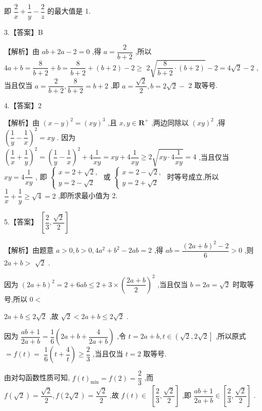 \documentclass[10pt]{article}
\begin{document}
即 $\dfrac{2}{x} + \dfrac{1}{y} - \dfrac{2}{z}$ 的最大值是 1.

3.【答案】B

【解析】由 ${ab} + {2a} - 2 = 0$ ,得 $a = \dfrac{2}{b + 2}$ ,所以 ${4a} + b = \dfrac{8}{b + 2} + b = \dfrac{8}{b + 2} + \left( {b + 2}\right)  - 2 \geq$  $2\sqrt{\dfrac{8}{b + 2} \cdot  \left( {b + 2}\right) } - 2 = 4\sqrt{2} - 2$ ,当且仅当 $a = \dfrac{2}{b + 2},\dfrac{8}{b + 2} = b + 2$ ,即 $a = \dfrac{\sqrt{2}}{2},b = 2\sqrt{2} -$ 2 取等号.

4.【答案】2

【解析】由 ${\left( x - y\right) }^{2} = {\left( xy\right) }^{3}$ ,且 $x,y \in  {\mathbf{R}}^{ + }$ ,两边同除以 ${\left( xy\right) }^{2}$ ,得 ${\left( \dfrac{1}{y} - \dfrac{1}{x}\right) }^{2} = {xy}$ . 因为 ${\left( \dfrac{1}{x} + \dfrac{1}{y}\right) }^{2} = {\left( \dfrac{1}{y} - \dfrac{1}{x}\right) }^{2} + 4\dfrac{1}{xy} = {xy} + 4\dfrac{1}{xy} \geq  2\sqrt{{xy} \cdot  4\dfrac{1}{xy}} = 4$ ,当且仅当 ${xy} = 4\dfrac{1}{xy}$ , 即 $\left\{  \begin{array}{l} x = 2 + \sqrt{2}, \\  y = 2 - \sqrt{2} \end{array}\right.$ 或 $\left\{  \begin{array}{l} x = 2 - \sqrt{2}, \\  y = 2 + \sqrt{2} \end{array}\right.$ 时等号成立,所以 $\dfrac{1}{x} + \dfrac{1}{y} \geq  \sqrt{4} = 2$ ,即所求最小值为 2.

5.【答案】 $\left\lbrack  {\dfrac{2}{3},\dfrac{\sqrt{2}}{2}}\right\rbrack$

【解析】由题意 $a > 0,b > 0,4{a}^{2} + {b}^{2} - {2ab} = 2$ ,得 ${ab} = \dfrac{{\left( 2a + b\right) }^{2} - 2}{6} > 0$ ,则 ${2a} + b >$  $\sqrt{2}$ .

因为 ${\left( 2a + b\right) }^{2} = 2 + {6ab} \leq  2 + 3 \times  {\left( \dfrac{{2a} + b}{2}\right) }^{2}$ ,当且仅当 $b = {2a} = \sqrt{2}$ 时取等号,所以 $0 <$

${2a} + b \leq  2\sqrt{2}$ ,故 $\sqrt{2} < {2a} + b \leq  2\sqrt{2}$ .

因为 $\dfrac{{ab} + 1}{{2a} + b} = \dfrac{1}{6}\left( {{2a} + b + \dfrac{4}{{2a} + b}}\right)$ ,令 $t = {2a} + b,t \in  \left( {\sqrt{2},2\sqrt{2}}\right\rbrack$ ,所以原式 $= f\left( t\right)  =$  $\dfrac{1}{6}\left( {t + \dfrac{4}{t}}\right)  \geq  \dfrac{2}{3}$ ,当且仅当 $t = 2$ 取等号.

由对勾函数性质可知, $f{\left( t\right) }_{\min } = f\left( 2\right)  = \dfrac{2}{3}$ ,而 $f\left( \sqrt{2}\right)  = \dfrac{\sqrt{2}}{2},f\left( {2\sqrt{2}}\right)  = \dfrac{\sqrt{2}}{2}$ ,故 $f\left( t\right)  \in$  $\left\lbrack  {\dfrac{2}{3},\dfrac{\sqrt{2}}{2}}\right\rbrack$ ,即 $\dfrac{{ab} + 1}{{2a} + b} \in  \left\lbrack  {\dfrac{2}{3},\dfrac{\sqrt{2}}{2}}\right\rbrack$ .
\end{document}
